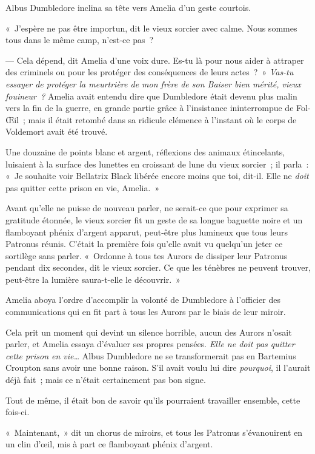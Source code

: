 Albus Dumbledore inclina sa tête vers Amelia d'un geste courtois.

«~J'espère ne pas être importun, dit le vieux sorcier avec calme. Nous sommes tous dans le même camp, n'est-ce pas~?

--- Cela dépend, dit Amelia d'une voix dure. Es-tu là pour nous aider à attraper des criminels ou pour les protéger des conséquences de leurs actes~?~» \emph{Vas-tu essayer de protéger la meurtrière de mon frère de son Baiser bien mérité, vieux fouineur~?} Amelia avait entendu dire que Dumbledore était devenu plus malin vers la fin de la guerre, en grande partie grâce à l'insistance ininterrompue de Fol-Œil~; mais il était retombé dans sa ridicule clémence à l'instant où le corps de Voldemort avait été trouvé.

Une douzaine de points blanc et argent, réflexions des animaux étincelants, luisaient à la surface des lunettes en croissant de lune du vieux sorcier~; il parla~: «~Je souhaite voir Bellatrix Black libérée encore moins que toi, dit-il. Elle ne \emph{doit} pas quitter cette prison en vie, Amelia.~»

Avant qu'elle ne puisse de nouveau parler, ne serait-ce que pour exprimer sa gratitude étonnée, le vieux sorcier fit un geste de sa longue baguette noire et un flamboyant phénix d'argent apparut, peut-être plus lumineux que tous leurs Patronus réunis. C'était la première fois qu'elle avait vu quelqu'un jeter ce sortilège sans parler. «~Ordonne à tous tes Aurors de dissiper leur Patronus pendant dix secondes, dit le vieux sorcier. Ce que les ténèbres ne peuvent trouver, peut-être la lumière saura-t-elle le découvrir.~»

Amelia aboya l'ordre d'accomplir la volonté de Dumbledore à l'officier des communications qui en fit part à tous les Aurors par le biais de leur miroir.

Cela prit un moment qui devint un silence horrible, aucun des Aurors n'osait parler, et Amelia essaya d'évaluer ses propres pensées. \emph{Elle ne doit pas quitter cette prison en vie…} Albus Dumbledore ne se transformerait pas en Bartemius Croupton sans avoir une bonne raison. S'il avait voulu lui dire \emph{pourquoi}, il l'aurait déjà fait~; mais ce n'était certainement pas bon signe.

Tout de même, il était bon de savoir qu'ils pourraient travailler ensemble, cette fois-ci.

«~Maintenant,~» dit un chorus de miroirs, et tous les Patronus s'évanouirent en un clin d'œil, mis à part ce flamboyant phénix d'argent.

